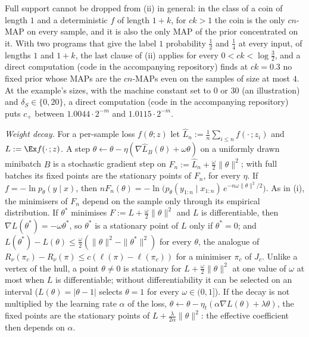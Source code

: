 Full support cannot be dropped from (ii) in general: in the class of a coin of length $1$ and a deterministic $f$ of length $1+k$, for $ck>1$ the coin is the only $cn$-MAP on every sample, and it is also the only MAP of the prior concentrated on it. With two programs that give the label $1$ probability $\frac12$ and $\frac14$ at every input, of lengths $1$ and $1+k$, the last clause of (ii) applies for every $0<ck<\log\frac32$, and a direct computation (code in the accompanying repository) finds at $ck=0.3$ no fixed prior whose MAPs are the $cn$-MAPs even on the samples of size at most $4$. At the example's sizes, with the machine constant set to $0$ or $30$ (an illustration) and $\delta_S\in\{0,20\}$, a direct computation (code in the accompanying repository) puts $c_+$ between $1.0044\cdot2^{-m}$ and $1.0115\cdot2^{-m}$.

\emph{Weight decay.} For a per-sample loss $f(\theta;z)$ let $\hat L_n:=\frac1n\sum_{i\le n}f(\cdot\,;z_i)$ and $L:=\Ex f(\cdot\,;z)$. A step $\theta\leftarrow\theta-\eta(\nabla\hat L_B(\theta)+\omega\theta)$ on a uniformly drawn minibatch $B$ is a stochastic gradient step on $F_n:=\hat L_n+\frac\omega2\|\theta\|^2$; with full batches its fixed points are the stationary points of $F_n$, for every $\eta$. If $f=-\ln p_\theta(y\mid x)$, then $nF_n(\theta)=-\ln\big(p_\theta(y_{1:n}\mid x_{1:n})\,e^{-n\omega\|\theta\|^2/2}\big)$. As in (i), the minimisers of $F_n$ depend on the sample only through its empirical distribution. If $\theta^*$ minimises $F:=L+\frac\omega2\|\theta\|^2$ and $L$ is differentiable, then $\nabla L(\theta^*)=-\omega\theta^*$, so $\theta^*$ is a stationary point of $L$ only if $\theta^*=0$; and $L(\theta^*)-L(\theta)\le\frac\omega2(\|\theta\|^2-\|\theta^*\|^2)$ for every $\theta$, the analogue of $R_\nu(\pi_c)-R_\nu(\pi)\le c(\ell(\pi)-\ell(\pi_c))$ for a minimiser $\pi_c$ of $J_c$. Unlike a vertex of the hull, a point $\theta\ne0$ is stationary for $L+\frac\omega2\|\theta\|^2$ at one value of $\omega$ at most when $L$ is differentiable; without differentiability it can be selected on an interval ($L(\theta)=|\theta-1|$ selects $\theta=1$ for every $\omega\in(0,1]$). If the decay is not multiplied by the learning rate $\alpha$ of the loss, $\theta\leftarrow\theta-\eta_t(\alpha\nabla L(\theta)+\lambda\theta)$, the fixed points are the stationary points of $L+\frac{\lambda}{2\alpha}\|\theta\|^2$: the effective coefficient then depends on $\alpha$.

